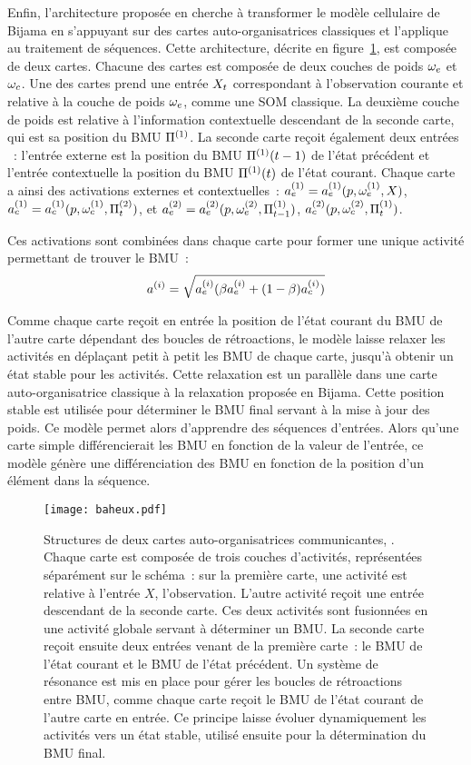\documentclass[../main]{subfiles}
\begin{document}
Enfin, l'architecture proposée en \cite{baheux_towards_2014} cherche à transformer le modèle cellulaire de Bijama en s'appuyant sur des cartes auto-organisatrices classiques et l'applique au traitement de séquences. Cette architecture, décrite en figure~\ref{fig:baheux}, est composée de deux cartes. 
Chacune des cartes est composée de deux couches de poids $\omega_e$ et $\omega_c$. Une des cartes prend une entrée $X_t$ correspondant à l'observation courante et relative à la couche de poids $\omega_e$, comme une SOM classique. 
La deuxième couche de poids est relative à l'information contextuelle descendant de la seconde carte, qui est sa position du BMU $\Pi^{({1})}$.
La seconde carte reçoit également deux entrées ~: l'entrée externe est la position du BMU $\Pi^{({1})}(t-1)$ de l'état précédent et l'entrée contextuelle la position du BMU $\Pi^{({1})}(t)$ de l'état courant. 
Chaque carte a ainsi des activations externes et contextuelles~: $a_e^{({1})} = a_e^{({1})}(p, \omega_e^{({1})},X)$, $a_c^{({1})} =  a_c^{({1})}(p, \omega_c^{({1})},\Pi^{({2})}_t)$, et $a_e^{({2})} = a_e^{({2})}(p, \omega_e^{({2})},\Pi^{({1})}_{t-1})$, $a_c^{({2})}(p, \omega_c^{({2})}, \Pi^{({1})}_t)$.

Ces activations sont combinées dans chaque carte pour former une unique activité permettant de trouver le BMU~:
$$
a^{({i})} = \sqrt{a_e^{({i})}(\beta a_e^{({i})} + (1-\beta) a_c^{({i})})}
$$

Comme chaque carte reçoit en entrée la position de l'état courant du BMU de l'autre carte dépendant des boucles de rétroactions, le modèle laisse relaxer les activités en déplaçant petit à petit les BMU de chaque carte, jusqu'à obtenir un état stable pour les activités. Cette relaxation est un parallèle dans une carte auto-organisatrice classique à la relaxation proposée en Bijama.
Cette position stable est utilisée pour déterminer le BMU final servant à la mise à jour des poids.
Ce modèle permet alors d'apprendre des séquences d'entrées. Alors qu'une carte simple différencierait les BMU en fonction de la valeur de l'entrée, ce modèle génère une différenciation des BMU en fonction de la position d'un élément dans la séquence.


\begin{figure}
    \centering
    \texttt{[image: baheux.pdf]}
    \caption{Structures de deux cartes auto-organisatrices communicantes, \parencite{baheux_towards_2014}. Chaque carte est composée de trois couches d'activités, représentées séparément sur le schéma~: sur la première carte, une activité est relative à l'entrée $X$, l'observation. L'autre activité reçoit une entrée descendant de la seconde carte. Ces deux activités sont fusionnées en une activité globale servant à déterminer un BMU. La seconde carte reçoit ensuite deux entrées venant de la première carte~: le BMU de l'état courant et le BMU de l'état précédent. Un système de résonance est mis en place pour gérer les boucles de rétroactions entre BMU, comme chaque carte reçoit le BMU de l'état courant de l'autre carte en entrée. Ce principe laisse évoluer dynamiquement les activités vers un état stable, utilisé ensuite pour la détermination du BMU final.\label{fig:baheux}}
\end{figure}
\end{document}
